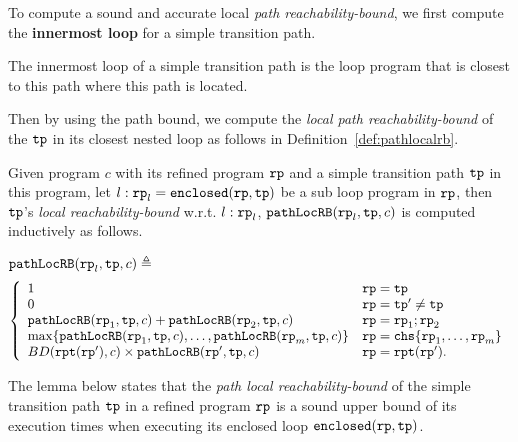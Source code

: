 To compute a sound and accurate local \emph{path reachability-bound},
we first compute the \textbf{innermost loop} for a simple transition path.
\begin{defn}
  \label{def:innermost}
  The innermost loop of a simple transition path is the loop program that is closest to this path where this path is located.
\end{defn}

Then by using the path bound, we compute the \emph{local path reachability-bound} of
the $\mathtt{tp}$ in its closest nested loop as follows in Definition~\ref{def:pathlocalrb}.
\begin{defn}
    \label{def:pathlocalrb}
    Given program $c$ with its refined program $\mathtt{rp}$ and a simple transition path $\mathtt{tp}$ in this program, 
    let $l: \mathtt{rp}_l = \mathtt{enclosed}(\mathtt{rp}, \mathtt{tp})$ be a sub loop program in $\mathtt{rp}$,
    then $\mathtt{tp}$'s \emph{local reachability-bound} w.r.t. $l: \mathtt{rp}_l$,
    $\mathtt{pathLocRB}(\mathtt{rp}_l, \mathtt{tp}, c)$
    is computed inductively as follows.

    $\mathtt{pathLocRB}(\mathtt{rp}_l, \mathtt{tp}, c) \triangleq$
    \[ 
      \left\{
    \begin{array}{ll}
       1  & \rprog = \tpath\\
      {0} & \rprog = \tpath' \neq \tpath\\
      \outinB(\rprog_1, \tpath, c) + \outinB(\rprog_2, \tpath, c) & \rprog = \rprog_1;\rprog_2 \\
      \max\left\{ \outinB(\rprog_1, \tpath, c), \ldots, \outinB(\rprog_m, \tpath, c) \right\} 
      & \rprog = \rpchoose{\rprog_1, \ldots, \rprog_m } \\
      BD(\rprepeat(\rprog'), c) \times \outinB(\rprog', \tpath, c) & \rprog = \rprepeat(\rprog').
    \end{array}
    \right.
    \]
\end{defn}
The lemma below states that the \emph{path local reachability-bound} of the simple transition path $\mathtt{tp}$ in a refined program $\mathtt{rp}$ is a sound upper bound of its execution times when executing its enclosed loop $\mathtt{enclosed}(\mathtt{rp}, \mathtt{tp})$.
